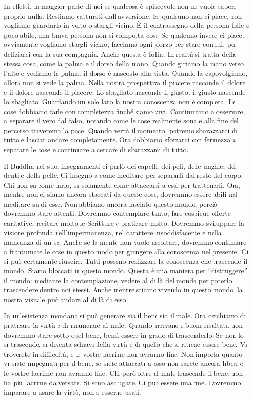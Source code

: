 In effetti, la maggior parte di noi se qualcosa è spiacevole non ne
vuole sapere proprio nulla. Restiamo catturati dall'avversione. Se
qualcuno non ci piace, non vogliamo guardarlo in volto o stargli vicino.
È il contrassegno della persona folle e poco abile, una brava persona
non si comporta così. Se qualcuno invece ci piace, ovviamente vogliamo
stargli vicino, facciamo ogni sforzo per stare con lui, per deliziarci
con la sua compagnia. Anche questa è follia. In realtà si tratta della
stessa cosa, come la palma e il dorso della mano. Quando giriamo la mano
verso l'alto e vediamo la palma, il dorso è nascosto alla vista. Quando
la capovolgiamo, allora non si vede la palma. Nella nostra prospettiva
il piacere nasconde il dolore e il dolore nasconde il piacere. Lo
sbagliato nasconde il giusto, il giusto nasconde lo sbagliato. Guardando
un solo lato la nostra conoscenza non è completa. Le cose dobbiamo farle
con completezza finché siamo vivi. Continuiamo a osservare, a separare
il vero dal falso, notando come le cose realmente sono e alla fine del
percorso troveremo la pace. Quando verrà il momento, potremo sbarazzarci
di tutto e lasciar andare completamente. Ora dobbiamo sforzarci con
fermezza a separare le cose e continuare a cercare di sbarazzarci di
tutto.

Il Buddha nei suoi insegnamenti ci parlò dei capelli, dei peli, delle
unghie, dei denti e della pelle. Ci insegnò a come meditare per
separarli dal resto del corpo. Chi non sa come farlo, sa solamente come
attaccarsi a essi per trattenerli. Ora, mentre non ci siamo ancora
staccati da queste cose, dovremmo essere abili nel meditare su di esse.
Non abbiamo ancora lasciato questo mondo, perciò dovremmo stare attenti.
Dovremmo contemplare tanto, fare cospicue offerte caritative, recitare
molto le Scritture e praticare molto. Dovremmo sviluppare la visione
profonda nell'impermanenza, nel carattere insoddisfacente e nella
mancanza di un sé. Anche se la mente non vuole ascoltare, dovremmo
continuare a frantumare le cose in questo modo per giungere alla
conoscenza nel presente. Ci si può certamente riuscire. Tutti possono
realizzare la conoscenza che trascende il mondo. Siamo bloccati in
questo mondo. Questa è una maniera per ``distruggere'' il mondo:
mediante la contemplazione, vedere al di là del mondo per poterlo
trascendere dentro noi stessi. Anche mentre stiamo vivendo in questo
mondo, la nostra visuale può andare al di là di esso.

In un'esistenza mondana si può generare sia il bene sia il male. Ora
cerchiamo di praticare la virtù e di rinunciare al male. Quando arrivano
i buoni risultati, non dovremmo stare sotto quel bene, bensì essere in
grado di trascenderlo. Se non lo si trascende, si diventa schiavi della
virtù e di quello che si ritiene essere bene. Vi troverete in
difficoltà, e le vostre lacrime non avranno fine. Non importa quanto vi
siate impegnati per il bene, se siete attaccati a esso non sarete ancora
liberi e le vostre lacrime non avranno fine. Chi però oltre al male
trascende il bene, non ha più lacrime da versare. Si sono asciugate. Ci
può essere una fine. Dovremmo imparare a usare la virtù, non a esserne
usati.

